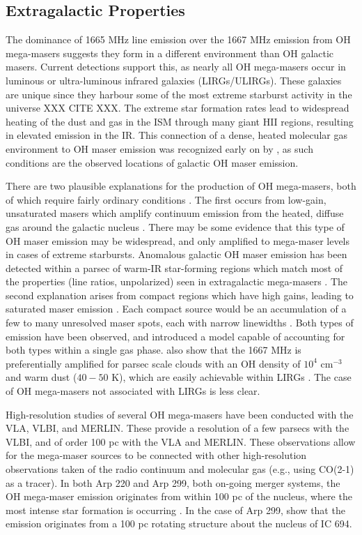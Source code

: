 \subsection{Extragalactic Properties}
\label{sub:oh_gal_props}

The dominance of 1665 MHz line emission over the 1667 MHz emission from OH mega-masers suggests they form in a different environment than OH galactic masers. Current detections support this, as nearly all OH mega-masers occur in luminous or ultra-luminous infrared galaxies (LIRGs/ULIRGs). These galaxies are unique since they harbour some of the most extreme starburst activity in the universe XXX CITE XXX. The extreme star formation rates lead to widespread heating of the dust and gas in the ISM through many giant HII regions, resulting in elevated emission in the IR. This connection of a dense, heated molecular gas environment to OH maser emission was recognized early on by \citet{Bottinelli_1987}, as such conditions are the observed locations of galactic OH maser emission. 

There are two plausible explanations for the production of OH mega-masers, both of which require fairly ordinary conditions \citep{lo2005}. The first occurs from low-gain, unsaturated masers which amplify continuum emission from the heated, diffuse gas around the galactic nucleus \citep[e.g.]{Baan_1985}. There may be some evidence that this type of OH maser emission may be widespread, and only amplified to mega-maser levels in cases of extreme starbursts. Anomalous galactic OH maser emission has been detected within a parsec of warm-IR star-forming regions which match most of the properties (line ratios, unpolarized) seen in extragalactic mega-masers \cite{Mirabel_1989}.  The second explanation arises from compact regions which have high gains, leading to saturated maser emission \citep[e.g.,]{lonsdale2002}. Each compact source would be an accumulation of a few to many unresolved maser spots, each with narrow linewidths \citet{lo2005}. Both types of emission have been observed, and \citet{Parra_2005} introduced a model capable of accounting for both types within a single gas phase. \citet{randell1995} also show that the 1667 MHz is preferentially amplified for parsec scale clouds with an OH density of $10^4$ cm$^{-3}$ and warm dust ($40-50$ K), which are easily achievable within LIRGs \citep{lo2005}. The case of OH mega-masers not associated with LIRGs is less clear.

High-resolution studies of several OH mega-masers have been conducted with the VLA, VLBI, and MERLIN. These provide a resolution of a few parsecs with the VLBI, and of order 100 pc with the VLA and MERLIN. These observations allow for the mega-maser sources to be connected with other high-resolution observations taken of the radio continuum and molecular gas (e.g., using CO(2-1) as a tracer). In both Arp 220 and Arp 299, both on-going merger systems, the OH mega-maser emission originates from within 100 pc of the nucleus, where the most intense star formation is occurring \citet{Lonsdale_1994, Baan_1990}. In the case of Arp 299, \citet{Baan_1990} show that the emission originates from a 100 pc rotating structure about the nucleus of IC 694.

